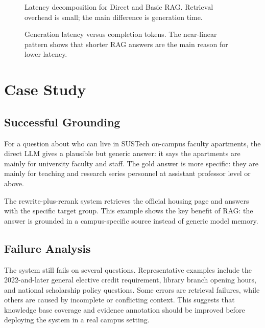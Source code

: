 \begin{figure}[t]
\centering
{}
\caption{Latency decomposition for Direct and Basic RAG. Retrieval overhead is small; the main difference is generation time.}
\label{fig:latency_breakdown}
\end{figure}

\begin{figure}[t]
\centering
{}
\caption{Generation latency versus completion tokens. The near-linear pattern shows that shorter RAG answers are the main reason for lower latency.}
\label{fig:latency_tokens}
\end{figure}

\section{Case Study}

\subsection{Successful Grounding}

For a question about who can live in SUSTech on-campus faculty apartments, the direct LLM gives a plausible but generic answer: it says the apartments are mainly for university faculty and staff. The gold answer is more specific: they are mainly for teaching and research series personnel at assistant professor level or above.

The rewrite-plus-rerank system retrieves the official housing page and answers with the specific target group. This example shows the key benefit of RAG: the answer is grounded in a campus-specific source instead of generic model memory.

\subsection{Failure Analysis}

The system still fails on several questions. Representative examples include the 2022-and-later general elective credit requirement, library branch opening hours, and national scholarship policy questions. Some errors are retrieval failures, while others are caused by incomplete or conflicting context. This suggests that knowledge base coverage and evidence annotation should be improved before deploying the system in a real campus setting.

